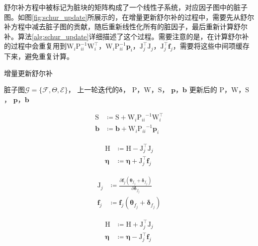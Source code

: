 舒尔补方程中被标记为脏块的矩阵构成了一个线性子系统，对应因子图中的脏子图。如图\ref{fig:schur_update}所展示的，在增量更新舒尔补的过程中，需要先从舒尔补方程中减去脏子图的贡献，随后重新线性化所有的脏因子，最后重新计算舒尔补。算法\ref{alg:schur_update}详细描述了这个过程。需要注意的是，在计算舒尔补的过程中会重复用到$\mathrm{W}_i\mathrm{P}_{ii}^{-1}\mathrm{W}_i^\top$，$\mathrm{W}_i\mathrm{P}_{ii}^{-1}\bm{p}_i$，$\mathrm{J}_j^\top\mathrm{J}_j$，$\mathrm{J}_j^\top\bm{f}_j$，需要将这些中间项缓存下来，避免重复计算。

\begin{algorithm}
\caption{增量更新舒尔补}
\begin{algorithmic}
    \Require 脏子图$\mathcal{G}=\{\mathcal{F},\Theta,\mathcal{E}\}$，
             上一轮迭代的$\bm{\delta}$，
             $\mathrm{P}$，$\mathrm{W}$，$\mathrm{S}$，
             $\bm{p}$，$\bm{b}$
    \Ensure 更新后的
            $\mathrm{P}$，$\mathrm{W}$，$\mathrm{S}$，
            $\bm{p}$，$\bm{b}$

        \[\begin{aligned}
                \mathrm{S} &\coloneqq \mathrm{S} + \mathrm{W}_i{\mathrm{P}_{ii}}^{-1}\mathrm{W}_i^\top \\
                \bm{b}     &\coloneqq \bm{b}     + \mathrm{W}_i{\mathrm{P}_{ii}}^{-1}\bm{p}_i
        \end{aligned}\]
    \EndFor

        \State {}
        \[\begin{aligned}
                \mathrm{H} &\coloneqq \mathrm{H} - \mathrm{J}_j^\top \mathrm{J}_j \\
                \bm{\eta}  &\coloneqq \bm{\eta} + \mathrm{J}_j^\top \bm{f}_j
        \end{aligned}\]

        \State {}
        \[\begin{aligned}
                \mathrm{J}_j &\coloneqq \frac{\partial{\bm{f}_j(\bm{\theta}_{f_j}+\bm{\delta}_{f_j})}}
                                             {\partial{\bm{\delta}_{f_j}}} \\
                \bm{f}_j     &\coloneqq \bm{f}_j(\bm{\theta}_{f_j}+\bm{\delta}_{f_j})
        \end{aligned}\]

        \State {}
        \[\begin{aligned}
                \mathrm{H} &\coloneqq \mathrm{H} + \mathrm{J}_j^\top\mathrm{J}_j \\
                \bm{\eta}  &\coloneqq \bm{\eta}  - \mathrm{J}_j^\top\bm{f}_j
        \end{aligned}\]
    \EndFor


\end{algorithmic}
\end{algorithm}

